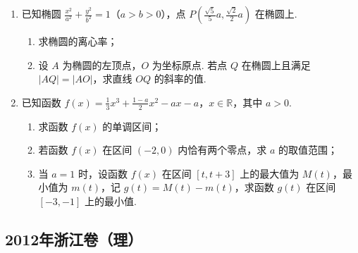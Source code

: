 \begin{description}
\begin{enumerate}[leftmargin=5pt]
        \item 已知椭圆 \(\frac{x^2}{a^2} + \frac{y^2}{b^2} = 1\)（\(a > b > 0\)），点 \(P\left(\frac{\sqrt{5}}{5}a, \frac{\sqrt{2}}{2}a\right)\) 在椭圆上.
\begin{enumerate}
\item 求椭圆的离心率；
\item 设 \(A\) 为椭圆的左顶点，\(O\) 为坐标原点. 若点 \(Q\) 在椭圆上且满足 \(|AQ| = |AO|\)，求直线 \(OQ\) 的斜率的值.
\end{enumerate}

        \item 已知函数 \(f(x) = \frac{1}{3} x^3 + \frac{1 - a}{2} x^2 - ax - a\)，\(x \in \mathbb{R}\)，其中 \( a > 0 \).
\begin{enumerate}
\item 求函数 \( f(x) \) 的单调区间；
\item 若函数 \( f(x) \) 在区间 \((-2,0)\) 内恰有两个零点，求 \( a \) 的取值范围；
\item 当 \(a = 1\) 时，设函数 \(f(x)\) 在区间 \([t, t + 3]\) 上的最大值为 \(M(t)\)，最小值为 \(m(t)\)，记 \(g(t) = M(t) - m(t)\)，求函数 \(g(t)\) 在区间 \([-3, -1]\) 上的最小值.
\end{enumerate}

    \end{enumerate}

\end{description}


\subsection{2012年浙江卷（理）}\label{gk:2012年浙江卷（理）}

